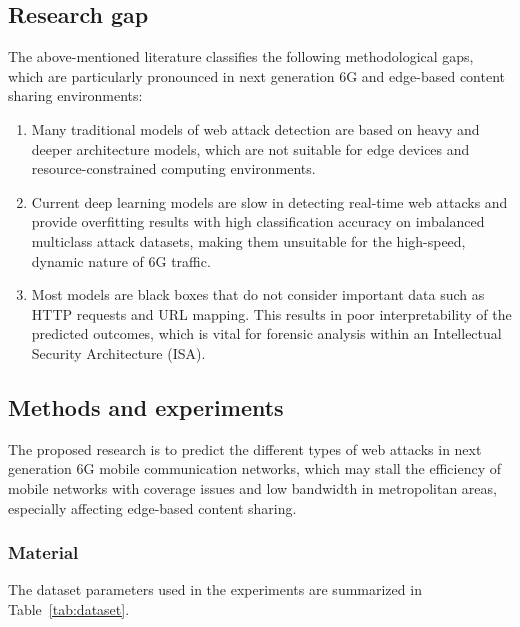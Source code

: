 \subsection{Research gap}\label{sec:gap}

The above-mentioned literature classifies the following methodological gaps, which are
particularly pronounced in next generation 6G and edge-based content sharing environments:

\begin{enumerate}
  \item Many traditional models of web attack detection are based on heavy and deeper architecture
        models, which are not suitable for edge devices and resource-constrained computing
        environments.
  \item Current deep learning models are slow in detecting real-time web attacks and provide
        overfitting results with high classification accuracy on imbalanced multiclass attack
        datasets, making them unsuitable for the high-speed, dynamic nature of 6G traffic.
  \item Most models are black boxes that do not consider important data such as HTTP requests and
        URL mapping. This results in poor interpretability of the predicted outcomes, which is
        vital for forensic analysis within an Intellectual Security Architecture (ISA).
\end{enumerate}

\subsection{Methods and experiments}\label{sec:methods}

The proposed research is to predict the different types of web attacks in next generation 6G
mobile communication networks, which may stall the efficiency of mobile networks with coverage
issues and low bandwidth in metropolitan areas, especially affecting edge-based content sharing.

\subsubsection{Material}\label{sec:material}

The dataset parameters used in the experiments are summarized in
Table~\ref{tab:dataset}.

